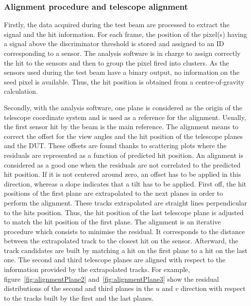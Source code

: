       \subsubsection{Alignment procedure and telescope alignment}

      Firstly, the data acquired during the test beam are processed to extract the signal and the hit information.
      For each frame, the position of the pixel(s) having a signal above the discriminator threshold is stored and assigned to an ID corresponding to a sensor.
      The analysis software is in charge to assign correctly the hit to the sensors and then to group the pixel fired into clusters.
      As the sensors used during the test beam have a binary output, no information on the seed pixel is available.
      Thus, the hit position is obtained from a centre-of-gravity calculation.

      Secondly, with the analysis software, one plane is considered as the origin of the telescope coordinate system and is used as a reference for the alignment.
      Usually, the first sensor hit by the beam is the main reference.
      The alignment means to correct the offset for the view angles and the hit position of the telescope planes and the \gls{DUT}.
      These offsets are found thanks to scattering plots where the residuals are represented as a function of predicted hit position.
      An alignment is considered as a good one when the residuals are not correlated to the predicted hit position.
      If it is not centered around zero, an offset has to be applied in this direction, whereas a slope indicates that a tilt has to be applied.
      First off, the hit positions of the first plane are extrapolated to the next planes in order to perform the alignment.
      These tracks extrapolated are straight lines perpendicular to the hits position.
      Thus, the hit position of the last telescope plane is adjusted to match the hit position of the first plane.
      The alignment is an iterative procedure which consists to minimise the residual. 
      It corresponds to the distance between the extrapolated track to the closest hit on the sensor.
      Afterward, the track candidates are built by matching a hit on the first plane to a hit on the last one.
      The second and third telescope planes are aligned with respect to the information provided by the extrapolated tracks.
      For example, figure~\ref{fig:alignmentPlane2} and~\ref{fig:alignmentPlane3} show the residual distributions of the second and third planes in the $u$ and $v$ direction with respect to the tracks built by the first and the last planes.

